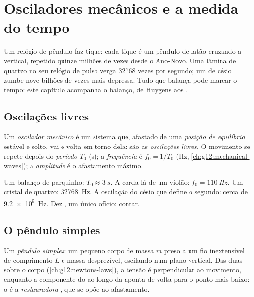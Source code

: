 \chapter{Osciladores mecânicos e a medida do tempo}\label{ch:g12:oscillators-and-time}

Um relógio de pêndulo faz tique: cada tique é um pêndulo de latão cruzando a vertical,
repetido quinze milhões de vezes desde o Ano-Novo. Uma lâmina de quartzo no seu relógio
de pulso verga \num{32768} vezes por segundo; um  de césio zumbe nove bilhões de
vezes mais depressa. Tudo que balança pode marcar o tempo: este capítulo acompanha o
balanço, de Huygens aos .

\section{Oscilações livres}

\begin{definition}\label{def:g12:oscillators-and-time:oscillator}
Um \emph{oscilador mecânico} é um sistema que, afastado de uma
\emph{posição de equilíbrio} estável e solto, vai e volta
em torno dela: são as \emph{oscilações livres}. O movimento
se repete depois do \emph{período} $T_0$ (\unit{s}); a
\emph{frequência} é $f_0 = 1/T_0$ (\unit{Hz},
\cref{ch:g12:mechanical-waves}); a \emph{amplitude} é o afastamento
máximo.
\end{definition}

\begin{example}\label{ex:g12:oscillators-and-time:zoo}
Um balanço de parquinho: $T_0 \approx \qty{3}{s}$. A corda lá de um violão:
$f_0 = \qty{110}{Hz}$. Um cristal de quartzo: \qty{32768}{Hz}. A oscilação do césio que
define o segundo: cerca de \qty{9.2e9}{Hz}. Dez , um único ofício:
contar.
\end{example}

\section{O pêndulo simples}

\begin{definition}\label{def:g12:oscillators-and-time:pendulum}
Um \emph{pêndulo simples}: um pequeno corpo de massa $m$ preso a
um fio inextensível de comprimento $L$ e massa desprezível, oscilando num plano
vertical. Das duas  sobre o corpo (\cref{ch:g12:newtons-laws}), a tensão é
perpendicular ao movimento, enquanto a componente do  ao longo da  aponta
de volta para o ponto mais baixo: o  é a \emph{ restauradora}%
, que se opõe ao afastamento.
\end{definition}


